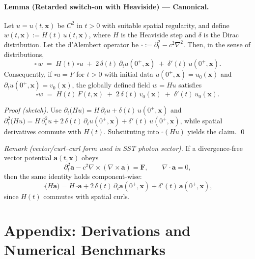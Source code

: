 \documentclass[reprint,aps,onecolumn,nofootinbib]{revtex4-2}
\begin{document}
    \paragraph{Lemma (Retarded switch-on with Heaviside) — Canonical.}
        Let $u=u(t,\mathbf{x})$ be $C^2$ in $t>0$ with suitable spatial regularity, and define $w(t,\mathbf{x}) := H(t)\,u(t,\mathbf{x})$, where $H$ is the Heaviside step and $\delta$ is the Dirac distribution.
        Let the d’Alembert operator be $\square := \partial_t^2 - c^2 \nabla^2$. Then, in the sense of distributions,
        \[
            \square\,w \;=\; H(t)\,\square u \;+\; 2\,\delta(t)\,\partial_t u(0^+,\mathbf{x}) \;+\; \delta'(t)\,u(0^+,\mathbf{x}).
        \]
        Consequently, if $\square u = F$ for $t>0$ with initial data $u(0^+,\mathbf{x})=u_0(\mathbf{x})$ and $\partial_t u(0^+,\mathbf{x})=v_0(\mathbf{x})$, the globally defined field $w=H u$ satisfies
        \[
            \square w \;=\; H(t)\,F(t,\mathbf{x}) \;+\; 2\,\delta(t)\,v_0(\mathbf{x}) \;+\; \delta'(t)\,u_0(\mathbf{x}).
        \]

        \emph{Proof (sketch).}
        Use $\partial_t\!\big(Hu\big)=H\,\partial_t u+\delta(t)\,u(0^+,\mathbf{x})$ and
        $\partial_t^2\!\big(Hu\big)=H\,\partial_t^2u+2\,\delta(t)\,\partial_t u(0^+,\mathbf{x})+\delta'(t)\,u(0^+,\mathbf{x})$,
        while spatial derivatives commute with $H(t)$. Substituting into $\square(Hu)$ yields the claim. \qed

        \emph{Remark (vector/curl–curl form used in SST photon sector).}
        If a divergence-free vector potential $\mathbf{a}(t,\mathbf{x})$ obeys
        \[
            \partial_t^2 \mathbf{a} - c^2 \nabla\times(\nabla\times \mathbf{a}) = \mathbf{F},\qquad \nabla\!\cdot\!\mathbf{a}=0,
        \]
        then the same identity holds component-wise:
        \[
            \square\!\big(H\mathbf{a}\big) = H\,\square\mathbf{a} + 2\,\delta(t)\,\partial_t \mathbf{a}(0^+,\mathbf{x}) + \delta'(t)\,\mathbf{a}(0^+,\mathbf{x}),
        \]
        since $H(t)$ commutes with spatial curls.

        \appendix
    \section{Appendix: Derivations and Numerical Benchmarks}
    \label{app:three-swirl-derivations}
\end{document}
